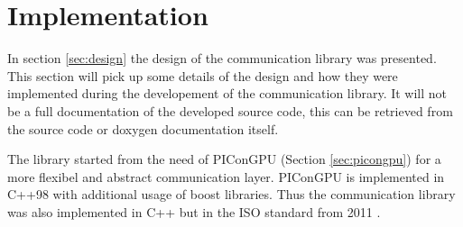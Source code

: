 \chapter{Implementation}
\label{sec:implementation}



In section \ref{sec:design} the design of the communication library
was presented.  This section will pick up some details of the design
and how they were implemented during the developement of the
communication library. It will not be a full documentation of the
developed source code, this can be retrieved from the source code
or doxygen \cite{ref:doxygen} documentation itself.

The library started from the need of PIConGPU (Section \ref{sec:picongpu})
for a more flexibel and abstract communication layer. PIConGPU is implemented
in C++98 with additional usage of boost \cite{ref:boost} libraries. Thus
the communication library was also implemented in C++ but in the
ISO standard from 2011 \cite{ref:c++11}.


